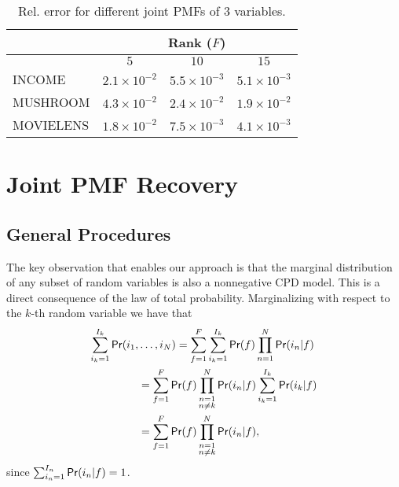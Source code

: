 \documentclass[journal]{IEEEtran}
\begin{document}
\begin{table}[!t]
\begin{center}
\caption{Rel. error for different joint PMFs of $3$ variables.}\label{table:real_data_rank}
\begin{tabular}{l  c  c c }
&  \multicolumn{3}{c}{Rank ($F$)} \\
\hline
     & $5$  & $10$ & $15$ \\
\hline
INCOME     & $ 2.1 \times 10^{-2} $	& $5.5 \times 10^{-3}$ & $5.1 \times 10^{-3}$   \\
\hline
MUSHROOM   & $4.3 \times 10^{-2} $	& $2.4 \times 10^{-2}$ & $1.9 \times 10^{-2}$  \\
\hline
MOVIELENS   & $  1.8 \times 10^{-2}$	& $7.5 \times 10^{-3}$ & $4.1 \times 10^{-3}$  \\
\hline
\end{tabular}
\end{center}
\end{table}

\section{Joint PMF Recovery}
\subsection{General Procedures}

The key observation that enables our approach is that the marginal distribution of any subset of random variables is also a nonnegative CPD model. This is a direct consequence of the law of total probability. Marginalizing with respect to the $k$-th random variable we have that
\begin{align}
 \sum_{i_k=1}^{I_k}  {\sf Pr}(i_1, &   \ldots,i_N)  =  \sum_{f=1}^F \sum_{i_k=1}^{I_k} {\sf Pr}(f) \prod_{n=1}^N {\sf Pr}(i_n | f)  \nonumber 
\\ &   = \sum_{f=1}^F {\sf Pr}(f) \prod_{\substack{n=1 \\ n \neq k} }^N {\sf Pr}(i_n | f) \sum_{i_k=1}^{I_k} {\sf Pr}(i_k | f)    \nonumber \\  &  = \sum_{f=1}^F  {\sf Pr}(f) \prod_{\substack{n=1 \\ n \neq k} }^N {\sf Pr}(i_n | f), 
\end{align}
since $\sum_{i_n=1}^{I_n}  {\sf Pr}(i_n | f)  = 1$.
\end{document}

